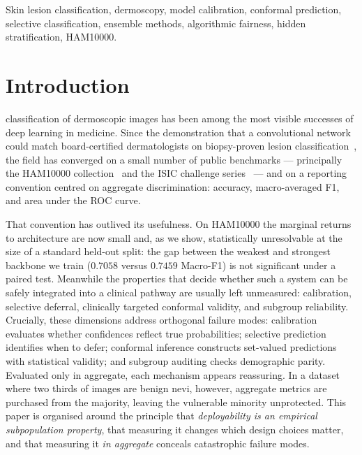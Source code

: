 \documentclass[journal]{IEEEtran}
\begin{document}
\begin{IEEEkeywords}
Skin lesion classification, dermoscopy, model calibration, conformal prediction, selective
classification, ensemble methods, algorithmic fairness, hidden stratification, HAM10000.
\end{IEEEkeywords}

\section{Introduction}
 classification of dermoscopic images has been among the most
visible successes of deep learning in medicine. Since the demonstration that a convolutional
network could match board-certified dermatologists on biopsy-proven lesion
classification~\cite{esteva2017}, the field has converged on a small number of public
benchmarks --- principally the HAM10000 collection~\cite{tschandl2018ham10000} and the ISIC
challenge series~\cite{codella2018isic} --- and on a reporting convention centred on
aggregate discrimination: accuracy, macro-averaged F1, and area under the ROC curve.

That convention has outlived its usefulness. On HAM10000 the marginal returns to
architecture are now small and, as we show, statistically unresolvable at the size of a
standard held-out split: the gap between the weakest and strongest backbone we train
($0.7058$ versus $0.7459$ Macro-F1) is not significant under a paired test. Meanwhile the
properties that decide whether such a system can be safely integrated into a clinical pathway
are usually left unmeasured: calibration, selective deferral, clinically targeted conformal
validity, and subgroup reliability. Crucially, these dimensions address orthogonal failure
modes: calibration evaluates whether confidences reflect true probabilities; selective prediction
identifies when to defer; conformal inference constructs set-valued predictions with statistical
validity; and subgroup auditing checks demographic parity. Evaluated only in aggregate, each
mechanism appears reassuring. In a dataset where two thirds of images are benign nevi, however,
aggregate metrics are purchased from the majority, leaving the vulnerable minority unprotected.
This paper is organised around the principle that \emph{deployability is an empirical
subpopulation property}, that measuring it changes which design choices matter, and that
measuring it \emph{in aggregate} conceals catastrophic failure modes.
\end{document}
